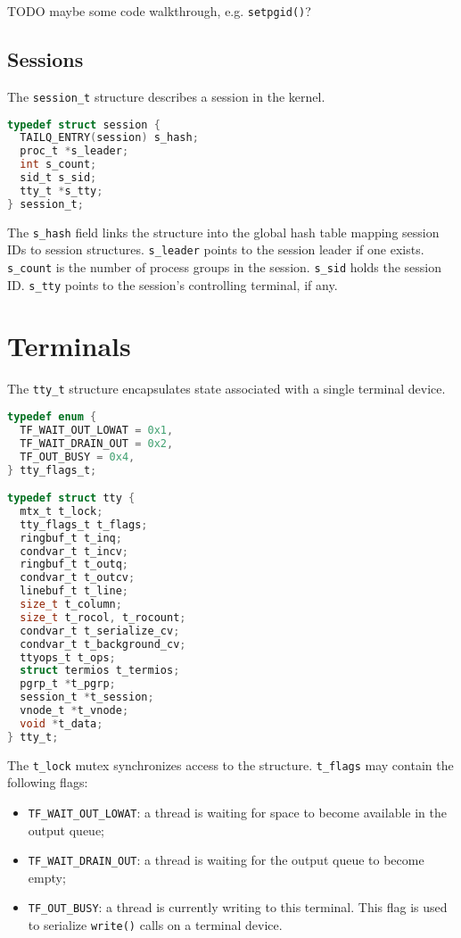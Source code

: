 \documentclass[shortabstract, manyadvisors, english, mgr]{iithesis}
\begin{document}
TODO maybe some code walkthrough, e.g. \texttt{setpgid()}?

\subsection{Sessions}
\label{chapter:sessions}

The \texttt{session\_t} structure describes a session in the kernel.

\noindent
\begin{minipage}{\linewidth}
\begin{lstlisting}[language=C,
caption={\texttt{include/sys/proc.h}: definition of \texttt{session\_t}.}]
typedef struct session {
  TAILQ_ENTRY(session) s_hash;
  proc_t *s_leader;
  int s_count;
  sid_t s_sid;
  tty_t *s_tty;
} session_t;
\end{lstlisting}
\end{minipage}
The \texttt{s\_hash} field links the structure into the global hash table
mapping session IDs to session structures. \texttt{s\_leader} points to the
session leader if one exists. \texttt{s\_count} is the number of process groups
in the session. \texttt{s\_sid} holds the session ID. \texttt{s\_tty} points to
the session's controlling terminal, if any.

\section{Terminals}

The \texttt{tty\_t} structure encapsulates state associated with a single
terminal device.

\noindent
\begin{minipage}{\linewidth}
\begin{lstlisting}[language=c,
caption={\texttt{include/sys/tty.h}: definition of \texttt{tty\_t}.}]
typedef enum {
  TF_WAIT_OUT_LOWAT = 0x1,
  TF_WAIT_DRAIN_OUT = 0x2,
  TF_OUT_BUSY = 0x4,
} tty_flags_t;

typedef struct tty {
  mtx_t t_lock;
  tty_flags_t t_flags;
  ringbuf_t t_inq;
  condvar_t t_incv;
  ringbuf_t t_outq;
  condvar_t t_outcv;
  linebuf_t t_line;
  size_t t_column;
  size_t t_rocol, t_rocount;
  condvar_t t_serialize_cv;
  condvar_t t_background_cv;
  ttyops_t t_ops;
  struct termios t_termios;
  pgrp_t *t_pgrp;
  session_t *t_session;
  vnode_t *t_vnode;
  void *t_data;
} tty_t;
\end{lstlisting}
\end{minipage}
The \texttt{t\_lock} mutex synchronizes access to the structure.
\texttt{t\_flags} may contain the following flags:
\begin{itemize}
\item \texttt{TF\_WAIT\_OUT\_LOWAT}: a thread is waiting for space to become
  available in the output queue;
\item \texttt{TF\_WAIT\_DRAIN\_OUT}: a thread is waiting for the output queue to
  become empty;
\item \texttt{TF\_OUT\_BUSY}: a thread is currently writing to this terminal.
  This flag is used to serialize \texttt{write()} calls on a terminal device.
\end{itemize}
\end{document}
